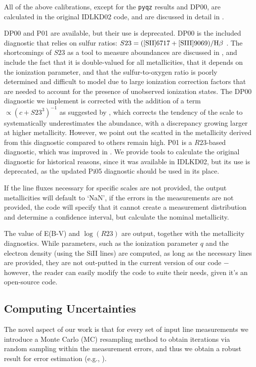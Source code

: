 \documentclass{emulateapj}
\begin{document}
All of the above calibrations, except for the \verb=pyqz= results and DP00, are calculated in the original IDLKD02 code, and are discussed in detail in \citet{kewley02,kewley08}. 

DP00 and P01 are available, but their use is deprecated. DP00 is the included diagnostic that relies on sulfur ratios: $ S23= {\rm ( [SII]6717+[SIII]9069) } / {\rm H}\beta $ . The shortcomings of $S23$ as a tool to measure aboundances are discussed in \citet{kewley02}, and include the fact that it is double-valued for all metallicities, that it depends on the ionization parameter, and that the sulfur-to-oxygen ratio is poorly determined and difficult to model due to large ionization correction factors that are needed to account for the presence of unobserved ionization states. The DP00 diagnostic we implement is corrected with the addition of a term $\propto (c+S23^3)^{-1}$ as suggested by \citep{kewley02}, which corrects the tendency of the scale to systematically underestimates the abundance, with a discrepancy growing larger at higher metallicity. However, we point out the scatted in the metallicity derived from this diagnostic compared to others remain high. P01 \citep{pilyugin01} is a $R23$-based diagnostic, which was improved in \citet{pilyugin05}. We provide tools to calculate the original diagnostic for historical reasons, since it was available in IDLKD02, but its use is deprecated, as the updated Pi05 diagnostic should be used in its place.

If the line fluxes necessary for specific scales are not provided, the output  metallicities will default to `NaN', if the errors in the measurements are not provided, the code will specify that it cannot create a measurement distribution and determine a confidence interval, but calculate the nominal metallicity.

The value of E(B-V) and $\log(R23)$ are output, together with the metallicity diagnostics. While parameters, such as the ionization parameter $q$ and the electron density (using the SiII lines) are computed, as long as the necessary lines are provided, they are not out-putted in the current version of our code $-$ however, the reader can easily modify the code to suite their needs, given it's an open-source code.



\subsection{Computing Uncertainties}
The novel aspect of our work is that for every set of input line measurements we introduce a Monte Carlo (MC) resampling method to obtain iterations via random sampling within the measurement errors, and thus we obtain a robust result for error estimation (e.g., \citealt{efron79,hastie09,andrae10}). 
\end{document}
